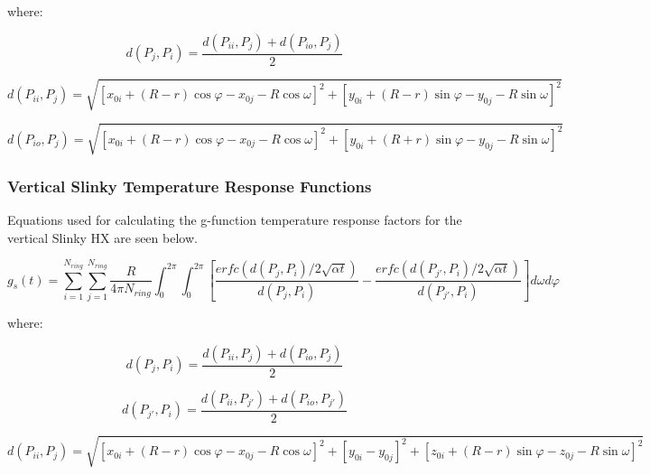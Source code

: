 where:

\begin{equation}
d\left(P_j,P_i\right) = \frac{d\left(P_{ii},P_j\right) + d\left(P_{io},P_j\right)}{2}
\end{equation}

\begin{equation}
d\left(P_{ii},P_j\right) = \sqrt{\left[x_{0i} + \left(R-r\right)\cos \varphi - x_{0j}-R\cos \omega\right]^2 + \left[y_{0i} + \left(R-r\right)\sin \varphi - y_{0j}-R\sin \omega\right]^2}
\end{equation}

\begin{equation}
d\left(P_{io},P_j\right) = \sqrt{\left[x_{0i} + \left(R-r\right)\cos \varphi - x_{0j}-R\cos \omega\right]^2 + \left[y_{0i} + \left(R+r\right)\sin \varphi - y_{0j}-R\sin \omega\right]^2}
\end{equation}

\subsubsection{Vertical Slinky Temperature Response Functions}\label{vertical-slinky-temperature-response-functions}

Equations used for calculating the g-function temperature response factors for the vertical Slinky HX are seen below.

\begin{equation}
g_s\left(t\right) = \sum_{i = 1}^{N_{ring}} \sum_{j = 1}^{N_{ring}} \frac{R}{4\pi N_{ring}} \int_0^{2\pi} \int_0^{2\pi} 
            \left[ 
                \frac{erfc\left(d\left(P_j,P_i\right)/2\sqrt{\alpha t}\right)}{d\left(P_j,P_i\right)} - 
                \frac{erfc\left(d\left(P_{j'},P_i\right)/2\sqrt{\alpha t}\right)}{d\left(P_{j'},P_i\right)}
            \right]d\omega d\varphi
\end{equation}

where:

\begin{equation}
d\left(P_j,P_i\right) = \frac{d\left(P_{ii},P_j\right) + d\left(P_{io},P_j\right)}{2}
\end{equation}

\begin{equation}
d\left(P_{j'},P_i\right) = \frac{d\left(P_{ii},P_{j'}\right) + d\left(P_{io},P_{j'}\right)}{2}
\end{equation}

{\scriptsize
\begin{equation}
d\left(P_{ii},P_j\right) = \sqrt{\left[x_{0i} + \left(R-r\right)\cos \varphi - x_{0j}-R\cos \omega\right]^2 + \left[y_{0i}-y_{0j}\right]^2 + \left[z_{0i} + \left(R-r\right)\sin \varphi - z_{0j}-R\sin \omega\right]^2}
\end{equation}}

